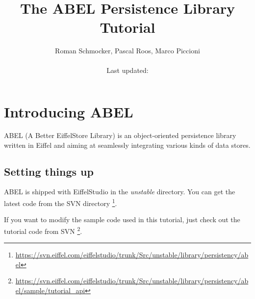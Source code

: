 \documentclass[a4paper,12pt]{report}
\title {The ABEL Persistence Library Tutorial}
\author {
	Roman Schmocker, Pascal Roos, Marco Piccioni\\\\
	Last updated:
}
\newcommand{\blankpage}{
\newpage
\thispagestyle{empty}
\mbox{}
\newpage
}
\begin{document}
\maketitle


%


\tableofcontents



%

\chapter{Introducing ABEL}
ABEL (A Better EiffelStore Library) is an object-oriented persistence library written in Eiffel and aiming at seamlessly integrating various kinds of data stores.
 
\section{Setting things up}
ABEL is shipped with EiffelStudio in the \emph{unstable} directory.
You can get the latest code from the SVN directory \footnote{\url{https://svn.eiffel.com/eiffelstudio/trunk/Src/unstable/library/persistency/abel}}.

If you want to modify the sample code used in this tutorial, just check out the tutorial code from SVN \footnote{\url{https://svn.eiffel.com/eiffelstudio/trunk/Src/unstable/library/persistency/abel/sample/tutorial_api}}.
\end{document}
